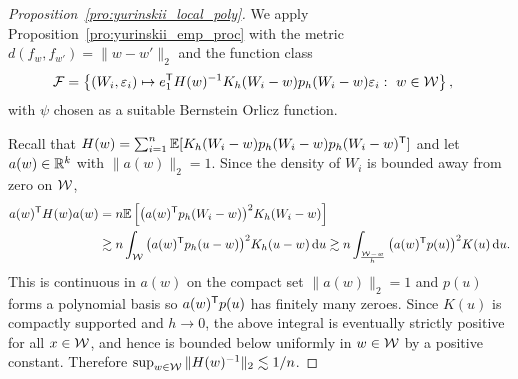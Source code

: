\begin{proof}[Proposition~\ref{pro:yurinskii_local_poly}]

  We apply Proposition~\ref{pro:yurinskii_emp_proc}
  with the metric $d(f_w, f_{w'}) = \|w-w'\|_2$
  and the function class
  \begin{align*}
    \mathcal{F}
    &=
    \left\{
      (W_i, \varepsilon_i) \mapsto
      e_1^{\mathsf{T}} H(w)^{-1} K_h(W_i-w) p_h(W_i-w)
      \varepsilon_i
      :\ w \in \mathcal{W}
    \right\},
  \end{align*}
  with $\psi$ chosen as a suitable Bernstein Orlicz function.


  Recall that
  $H(w) = \sum_{i=1}^n \mathbb{E}[K_h(W_i-w) p_h(W_i-w)p_h(W_i-w)^{\mathsf{T}}]$
  and let $a(w) \in \mathbb{R}^k$ with $\|a(w)\|_2 = 1$.
  Since the density of $W_i$ is bounded away from zero on $\mathcal{W}$,
  \begin{align*}
    a(w)^{\mathsf{T}} H(w) a(w)
    &=
    n \mathbb{E}\left[
      \big( a(w)^{\mathsf{T}} p_h(W_i-w) \big)^2
      K_h(W_i-w)
    \right] \\
    &\gtrsim
    n \int_{\mathcal{W}}
    \big( a(w)^{\mathsf{T}} p_h(u-w) \big)^2
    K_h(u-w)
    \,\mathrm{d}u
    \gtrsim
    n \int_{\frac{\mathcal{W}-w}{h}}
    \big( a(w)^{\mathsf{T}} p(u) \big)^2
    K(u)
    \,\mathrm{d}u.
  \end{align*}
  This is continuous in $a(w)$ on the compact set
  $\|a(w)\|_2 = 1$
  and $p(u)$ forms a polynomial basis so
  $a(w)^{\mathsf{T}} p(u)$ has finitely many zeroes.
  Since $K(u)$ is compactly supported
  and $h \to 0$,
  the above integral is eventually strictly positive
  for all $x \in \mathcal{W}$,
  and hence is bounded below uniformly in $w \in \mathcal{W}$
  by a positive constant.
  Therefore
  $\sup_{w \in \mathcal{W}} \|H(w)^{-1}\|_2 \lesssim 1/n$.



\end{proof}
